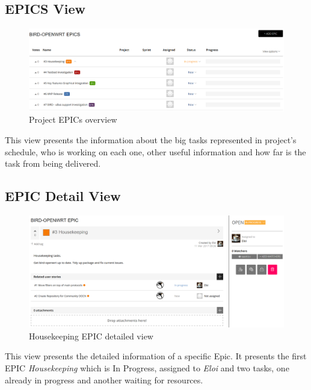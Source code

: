 \begin{appendices}
\begin{landscape}
\section{EPICS View}
\begin{figure}[h!]
\centering
    \includegraphics[width=\hsize]{images/kanban/epics}
    \caption{Project EPICs overview}
    \label{fig:kepic}
\end{figure}

This view presents the information about the big tasks represented in project's schedule, who is working on each one, other useful information and how far is the task from being delivered.
\newpage

\subsection{EPIC Detail View}
\begin{figure}[h!]
\centering
    \includegraphics[width=0.85\hsize]{images/kanban/epic-details}
    \caption{Housekeeping EPIC detailed view}
    \label{fig:kepicd}
\end{figure}
This view presents the detailed information of a specific Epic. It presents the first EPIC \textit{Housekeeping} which is In Progress, assigned to \textit{Eloi} and two tasks, one already in progress and another waiting for resources.
\newpage


\end{landscape}
\end{appendices}
